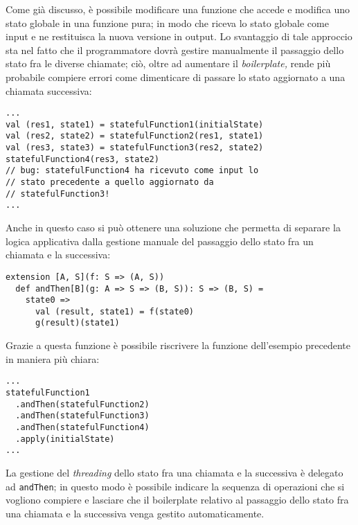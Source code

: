 Come già discusso, è possibile modificare una funzione che accede e modifica uno stato globale in una funzione pura; in modo che riceva lo stato globale come input e ne restituisca la nuova versione in output.
Lo svantaggio di tale approccio sta nel fatto che il programmatore dovrà gestire manualmente il passaggio dello stato fra le diverse chiamate; ciò, oltre ad aumentare il \emph{boilerplate,} rende più probabile compiere errori come dimenticare di passare lo stato aggiornato a una chiamata successiva:
\begin{lstlisting}[language=scala3]
...
val (res1, state1) = statefulFunction1(initialState)
val (res2, state2) = statefulFunction2(res1, state1)
val (res3, state3) = statefulFunction3(res2, state2)
statefulFunction4(res3, state2)
// bug: statefulFunction4 ha ricevuto come input lo
// stato precedente a quello aggiornato da 
// statefulFunction3!
...
\end{lstlisting}

Anche in questo caso si può ottenere una soluzione che permetta di separare la logica applicativa dalla gestione manuale del passaggio dello stato fra un chiamata e la successiva:
\begin{lstlisting}[language=scala3]
extension [A, S](f: S => (A, S))
  def andThen[B](g: A => S => (B, S)): S => (B, S) =
    state0 => 
      val (result, state1) = f(state0)
      g(result)(state1)
\end{lstlisting}
Grazie a questa funzione è possibile riscrivere la funzione dell'esempio precedente in maniera più chiara:
\begin{lstlisting}[language=scala3]
...
statefulFunction1
  .andThen(statefulFunction2)
  .andThen(statefulFunction3)
  .andThen(statefulFunction4)
  .apply(initialState)
...
\end{lstlisting}
La gestione del \emph{threading} dello stato fra una chiamata e la successiva è delegato ad \lstinline{andThen}; in questo modo è possibile indicare la sequenza di operazioni che si vogliono compiere e lasciare che il boilerplate relativo al passaggio dello stato fra una chiamata e la successiva venga gestito automaticamente.
